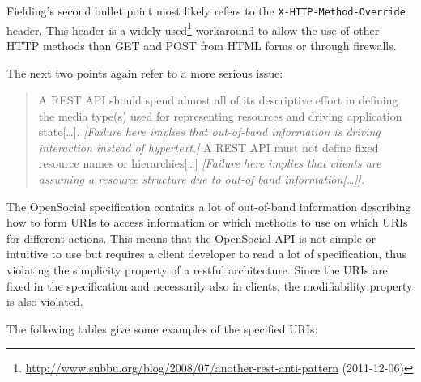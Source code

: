 \documentclass[12pt,a4paper]{scrartcl}		%
\newcommand{\citeurl}[2]{\url{#1} (#2)}
\begin{document}
Fielding's second bullet point most likely refers to the
\texttt{X-HTTP-Method-Override} header. This header is a widely
used\footnote{\citeurl{http://www.subbu.org/blog/2008/07/another-rest-anti-pattern}{2011-12-06}}
workaround to allow the use of other HTTP methods than GET and POST from HTML
forms or through firewalls.

The next two points again refer to a more serious issue:

\begin{quote}
  A REST API should spend almost all of its descriptive effort in defining the
  media type(s) used for representing resources and driving application
  state[\ldots].  \textit{[Failure here implies that out-of-band information is
    driving interaction instead of hypertext.]}  A REST API must not define
  fixed resource names or hierarchies[\ldots] \textit{[Failure here implies that
    clients are assuming a resource structure due to out-of band
    information[\ldots]].}
\end{quote}

The OpenSocial specification contains a lot of out-of-band information
describing how to form URIs to access information or which methods to use on
which URIs for different actions. This means that the OpenSocial API is not
simple or intuitive to use but requires a client developer to read a lot of
specification, thus violating the simplicity property of a restful
architecture. Since the URIs are fixed in the specification and necessarily also
in clients, the modifiability property is also violated\cite[sec
2.3]{Fielding2000}.

The following tables give some examples of the specified URIs:
\end{document}

